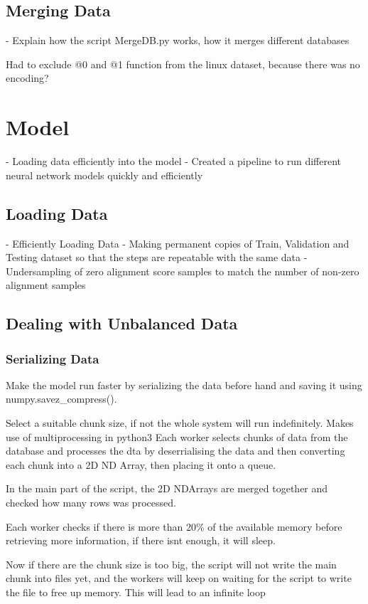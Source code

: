 \subsection{Merging Data}
 - Explain how the script MergeDB.py works, how it merges different databases

Had to exclude @0 and @1 function from the linux dataset, because there was no encoding?

\section{Model}
 - Loading data efficiently into the model
 - Created a pipeline to run different neural network models quickly and efficiently

\subsection{Loading Data}
 - Efficiently Loading Data
 - Making permanent copies of Train, Validation and Testing dataset so that the steps are repeatable with the same data
 - Undersampling of zero alignment score samples to match the number of non-zero alignment samples

\subsection{Dealing with Unbalanced Data}

\subsubsection{Serializing Data}
Make the model run faster by serializing the data before hand and saving it using numpy.savez\_compress().

Select a suitable chunk size, if not the whole system will run indefinitely.
Makes use of multiprocessing in python3
Each worker selects chunks of data from the database and processes the dta by deserrialising the data and then converting each chunk into a 2D ND Array, then placing it onto a queue.

In the main part of the script, the 2D NDArrays are merged together and checked how many rows was processed. 

Each worker checks if there is more than 20\% of the available memory before retrieving more information, if there isnt enough, it will sleep. 

Now if there are the chunk size is too big, the script will not write the main chunk into files yet, and the workers will keep on waiting for the script to write the file to free up memory. This will lead to an infinite loop

